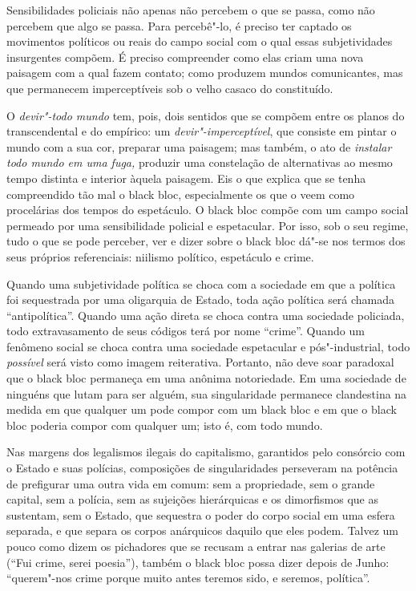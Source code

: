 Sensibilidades policiais não apenas não percebem o que se passa, como
não percebem que algo se passa. Para percebê"-lo, é preciso ter captado
os movimentos políticos ou reais do campo social com o qual essas
subjetividades insurgentes compõem. É preciso compreender como elas
criam uma nova paisagem com a qual fazem contato; como produzem mundos
comunicantes, mas que permanecem imperceptíveis sob o velho casaco do
constituído.

O \emph{devir"-todo mundo} tem, pois, dois sentidos que se compõem entre
os planos do transcendental e do empírico: um
\emph{devir"-imperceptível}, que consiste em pintar o mundo com a sua
cor, preparar uma paisagem; mas também, o ato de \emph{instalar todo
mundo em uma fuga, }produzir uma constelação de alternativas ao mesmo
tempo distinta e interior àquela paisagem. Eis o que explica que se
tenha compreendido tão mal o black bloc, especialmente os que o
veem como procelárias dos tempos do espetáculo. O black bloc
compõe com um campo social permeado por uma sensibilidade policial e
espetacular. Por isso, sob o seu regime, tudo o que se pode perceber,
ver e dizer sobre o black bloc dá"-se nos termos dos seus próprios
referenciais: niilismo político, espetáculo e crime.

Quando uma subjetividade política se choca com a sociedade em que a
política foi sequestrada por uma oligarquia de Estado, toda ação
política será chamada ``antipolítica''. Quando uma ação direta se choca
contra uma sociedade policiada, todo extravasamento de seus códigos terá
por nome ``crime''. Quando um fenômeno social se choca contra uma
sociedade espetacular e pós"-industrial, todo\emph{ possível }será visto
como imagem reiterativa. Portanto, não deve soar paradoxal que o
black bloc permaneça em uma anônima notoriedade. Em uma sociedade
de ninguéns que lutam para ser alguém, sua singularidade permanece
clandestina na medida em que qualquer um pode compor com um black
bloc e em que o black bloc poderia compor com qualquer um;
isto é, com todo mundo.

Nas margens dos legalismos ilegais do capitalismo, garantidos pelo
consórcio com o Estado e suas polícias, composições de singularidades
perseveram na potência de prefigurar uma outra vida em comum: sem a
propriedade, sem o grande capital, sem a polícia, sem as sujeições
hierárquicas e os dimorfismos que as sustentam, sem o Estado, que
sequestra o poder do corpo social em uma esfera separada, e que separa
os corpos anárquicos daquilo que eles podem. Talvez um pouco como dizem
os pichadores que se recusam a entrar nas galerias de arte (``Fui crime,
serei poesia''), também o black bloc possa dizer depois de Junho:
``querem"-nos crime porque muito antes teremos sido, e seremos,
política''.

